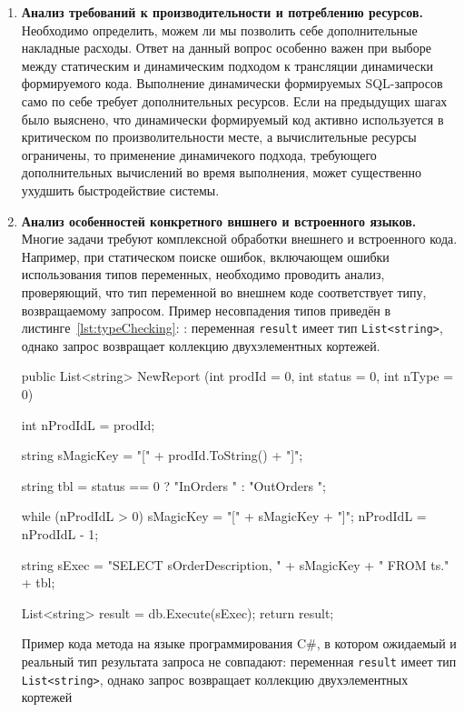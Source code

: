 \begin{enumerate}
  \item \textbf{Анализ требований к производительности и потреблению ресурсов.} Необходимо определить, можем ли мы позволить себе дополнительные накладные расходы. Ответ на данный вопрос особенно важен при выборе между статическим и динамическим подходом к трансляции динамически формируемого кода. Выполнение динамически формируемых SQL-запросов само по себе требует дополнительных ресурсов. Если на предыдущих шагах было выяснено, что динамически формируемый код активно используется в критическом по произволительности месте, а вычислительные ресурсы ограничены, то применение динамичекого подхода, требующего дополнительных вычислений во время выполнения, может существенно ухудшить быстродействие системы.
  
  \item \textbf{Анализ особенностей конкретного вншнего и встроенного языков.} Многие задачи требуют комплексной обработки внешнего и встроенного кода. Например, при статическом поиске ошибок, включающем ошибки использования типов переменных, необходимо проводить анализ, проверяющий, что тип переменной во внешнем коде соответствует типу, возвращаемому запросом. Пример несовпадения типов приведён в листинге~\ref{lst:typeChecking}: : переменная \texttt{result} имеет тип \texttt{List<string>}, однако запрос возвращает коллекцию двухэлементных кортежей.
  
\begin{listing}
    \begin{pyglist}[language=csharp,numbers=left,numbersep=5pt]

public List<string> NewReport
  (int prodId = 0, int status = 0, int nType = 0)
{
    int nProdIdL = prodId;

    string sMagicKey = "[" + prodId.ToString() + "]";

    string tbl = status == 0 ? "InOrders " : "OutOrders ";

    while (nProdIdL > 0)
    {
        sMagicKey = "[" + sMagicKey + "]";
        nProdIdL = nProdIdL - 1;
    }

    string sExec =
        "SELECT sOrderDescription, " + sMagicKey
        + " FROM ts." + tbl;

    List<string> result = db.Execute(sExec);
    return result;
}
\end{pyglist}
\caption{Пример кода метода на языке программирования C\#, в котором ожидаемый и реальный тип результата запроса не совпадают: переменная \texttt{result} имеет тип \texttt{List<string>}, однако запрос возвращает коллекцию двухэлементных кортежей}
\label{lst:typeChecking}
\end{listing}


\end{enumerate}
